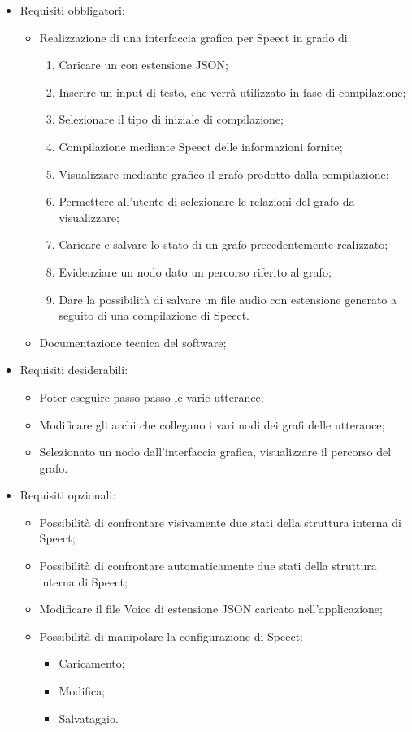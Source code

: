 \documentclass[../AnalisideiRequisiti.tex]{subfiles}
\begin{document}
\begin{itemize}
	\item{} Requisiti obbligatori:
	\begin{itemize}
		\item{}Realizzazione di una interfaccia grafica per Speect in grado di:
		\begin{enumerate}
			\item{} Caricare un  con estensione JSON;
			\item{} Inserire un input di testo, che verrà utilizzato in fase di compilazione;
			\item{} Selezionare il tipo di  iniziale di compilazione;
			\item{} Compilazione mediante Speect delle informazioni fornite;
			\item{} Visualizzare mediante grafico il grafo prodotto dalla compilazione;
			\item{} Permettere all'utente di selezionare le relazioni del grafo da visualizzare;
			\item{} Caricare e salvare lo stato di un grafo precedentemente realizzato;
			\item{} Evidenziare un nodo dato un percorso riferito al grafo;
			\item{} Dare la possibilità di salvare un file audio con estensione  generato a seguito di una compilazione di Speect.
		\end{enumerate}
		\item{}	Documentazione tecnica del software;
	\end{itemize}
	\item{} Requisiti desiderabili:
	\begin{itemize}
		\item{} Poter eseguire passo passo le varie utterance;
		\item{}	Modificare gli archi che collegano i vari nodi dei grafi delle utterance;
		\item{} Selezionato un nodo dall'interfaccia grafica, visualizzare il percorso del grafo.
	\end{itemize}
	\item{} Requisiti opzionali:
	\begin{itemize}
		\item{}	Possibilità di confrontare visivamente due stati della struttura interna di Speect;
		\item{} Possibilità di confrontare automaticamente due stati della struttura interna di Speect;
		\item{}Modificare il file Voice di estensione JSON caricato nell'applicazione;
		\item{}	Possibilità di manipolare la configurazione di Speect:
		\begin{itemize}
			\item{} Caricamento;
			\item{}	Modifica;
			\item{} Salvataggio.
		\end{itemize}
	\end{itemize}
	
\end{itemize}
\end{document}
